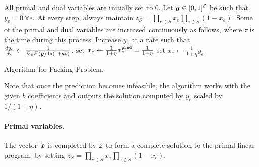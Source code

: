 \begin{algorithm}[ht]
\begin{algorithmic}[1]  
\STATE All primal and dual variables are initially set to 0. 
\STATE Let $\bm{y}\in[0,1]^{\cal E}$ be such that $y_{e} = 0 ~\forall e$. 
\STATE At every step, always maintain $z_{S} = \prod_{e \in S} x_{e}  \prod_{e \notin S} (1 - x_{e} )$.
	\ELSE {}
	\ENDIF
		\STATE Some of the primal and dual variables are increased continuously as follows, where $\tau$ is the time during this process.
		\STATE Increase $y_{e} $ at a rate such that $ \frac{dy_{e}}{d\tau} \gets \frac{1}{\nabla_{e} F(\bm{y}) \cdot \ln(1+ d\overline{\rho}  )}$.	
				\label{algo-packing:x}
	\ENDWHILE 
		\STATE set $x_{e}  \gets \frac{1}{1+\eta} x^{\texttt{pred}}_{e} = \frac{1}{1+\eta}$ 
	\ELSE\STATE set $x_{e}  \gets  \frac{1}{1+\eta} y_{e}$
	\ENDIF
\ENDFOR
\end{algorithmic}
\caption{Algorithm for Packing Problem.}
	\label{algo:packing}
\end{algorithm}

Note that once the prediction becomes infeasible, the algorithm works with the given $b$ coefficients and outputs the solution computed by 
$y_e$ scaled by $1/(1+\eta)$.

\paragraph{Primal variables.}
The vector $\bm{x}$ is completed by $\bm{z}$ to form a complete solution to
the primal linear program, by setting $z_{S} = \prod_{e \in S} x_{e}  \prod_
{e \notin S} (1 - x_{e} )$. 


